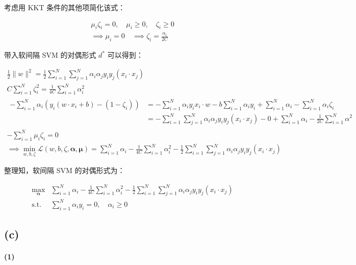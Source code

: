 \documentclass{ctexart}
\begin{document}
考虑用 KKT 条件的其他项简化该式：


\begin{gather*}
\mu_i\zeta_i=0,\quad \mu_i\ge 0,\quad \zeta_i\ge 0 \\
\implies \mu_i=0\quad \implies \zeta_i = \frac{\alpha_i}{2C}
\end{gather*}


带入软间隔 SVM 的对偶形式 \(d^\ast\) 可以得到：


\begin{gather*}
\frac{1}{2}\|w\|^2=\frac{1}{2}\sum_{i=1}^N\sum_{j=1}^N\alpha_i\alpha_jy_iy_j(x_i\cdot x_j) \\
C\sum_{i=1}^N\zeta_i^2 = \frac{1}{4C}\sum_{i=1}^N\alpha_i^2\\
\begin{aligned}
-\sum_{i=1}^N\alpha_i(y_i(w\cdot x_i+b) - (1-\zeta_i))&= -\sum_{i=1}^N\alpha_iy_ix_i\cdot w-b\sum_{i=1}^N\alpha_iy_i+\sum_{i=1}^N\alpha_i-\sum_{i=1}^N\alpha_i\zeta_i\\
&=-\sum_{i=1}^N\sum_{j=1}^N\alpha_i\alpha_jy_iy_j(x_i\cdot x_j)-0+\sum_{i=1}^N\alpha_i-\frac{1}{2C}\sum_{i=1}^N\alpha^2
\end{aligned}\\
-\sum_{i=1}^N\mu_i\zeta_i=0\\
\implies \min_{w,b,\zeta}\mathcal L(w,b,\zeta,\boldsymbol \alpha, \boldsymbol \mu)=\sum_{i=1}^N\alpha_i - \frac{1}{4C}\sum_{i=1}^N\alpha_i^2-\frac{1}{2}\sum_{i=1}^{N}\sum_{j=1}^{N}\alpha_i\alpha_jy_iy_j(x_i\cdot x_j)
\end{gather*}


整理知，软间隔 SVM 的对偶形式为：

\begin{equation*}
\begin{matrix}
\displaystyle\max_{\boldsymbol \alpha}&\displaystyle\sum_{i=1}^N\alpha_i - \frac{1}{4C}\sum_{i=1}^N\alpha_i^2-\frac{1}{2}\sum_{i=1}^{N}\sum_{j=1}^{N}\alpha_i\alpha_jy_iy_j(x_i\cdot x_j)\\
\text{s.t.} & \displaystyle \sum_{i=1}^N\alpha_iy_i = 0, \quad \alpha_i\ge 0
\end{matrix}
\end{equation*}


\subsection{(c)}\label{c}

\paragraph{(1)}\label{section}
\end{document}
